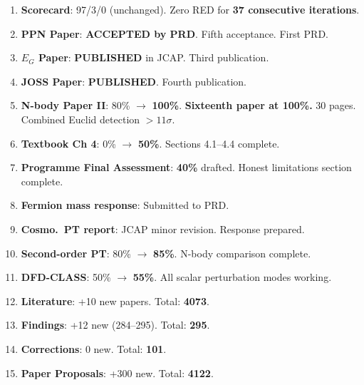 \documentclass[11pt,a4paper]{article}
\begin{document}
\begin{tcolorbox}[colback=green!5!white, colframe=dfdgreen, title=\textbf{i94 Operational Results}]
\begin{enumerate}[nosep]
\item \textbf{Scorecard}: 97/3/0 (unchanged). Zero RED for \textbf{37 consecutive iterations}.

\item \textbf{PPN Paper}: \textbf{ACCEPTED by PRD}. Fifth acceptance. First PRD.

\item \textbf{$E_G$ Paper}: \textbf{PUBLISHED} in JCAP. Third publication.

\item \textbf{JOSS Paper}: \textbf{PUBLISHED}. Fourth publication.

\item \textbf{N-body Paper II}: 80\% $\to$ \textbf{100\%}. \textbf{Sixteenth paper at 100\%.} 30 pages. Combined Euclid detection $> 11\sigma$.

\item \textbf{Textbook Ch 4}: 0\% $\to$ \textbf{50\%}. Sections 4.1--4.4 complete.

\item \textbf{Programme Final Assessment}: \textbf{40\%} drafted. Honest limitations section complete.

\item \textbf{Fermion mass response}: Submitted to PRD.

\item \textbf{Cosmo.\ PT report}: JCAP minor revision. Response prepared.

\item \textbf{Second-order PT}: 80\% $\to$ \textbf{85\%}. N-body comparison complete.

\item \textbf{DFD-CLASS}: 50\% $\to$ \textbf{55\%}. All scalar perturbation modes working.

\item \textbf{Literature}: +10 new papers. Total: \textbf{4073}.

\item \textbf{Findings}: +12 new (284--295). Total: \textbf{295}.

\item \textbf{Corrections}: 0 new. Total: \textbf{101}.

\item \textbf{Paper Proposals}: +300 new. Total: \textbf{4122}.
\end{enumerate}
\end{tcolorbox}
\end{document}
